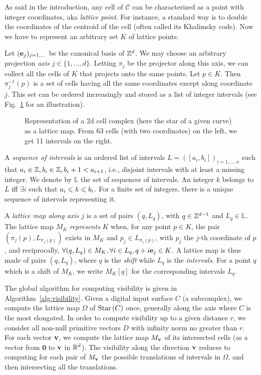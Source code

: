 As said in the introduction, any cell of $\mathcal{C}$ can be
characterized as a point with integer coordinates, aka \emph{lattice
point}. For instance, a standard way is to double the coordinates of
the centroid of the cell (often called its Khalimsky code). Now we
have to represent an arbitrary set $K$ of lattice points.

Let $(\mathbf{e}_j)_{j=1,\dots}$ be the canonical basis of $\mathbb{Z}^d$.  We may
choose an arbitrary projection \emph{axis} $j \in
\{1,\ldots,d\}$. Letting $\pi_j$ be the projector along this axis, we
can collect all the cells of $K$ that projects onto the same
points. Let $p \in K$. Then $\pi^{-1}_j(p)$ is a set of cells having
all the same coordinates except along coordinate $j$. This set can be
ordered increasingly and stored as a list of integer intervals (see
Fig.~\ref{fig:lattice-representation} for an illustration).

\begin{figure}[t]
  \centering
  
  \caption{\label{fig:lattice-representation} Representation of a
    2d cell complex (here the star of a given curve) as a lattice
    map. From 63 cells (with two coordinates) on the left, we get 11
    intervals on the right.}
\end{figure}


A \emph{sequence of intervals} is an ordered list of intervals $L =
([a_i,b_i])_{i=1,\ldots,n}$ such that $a_i \in \mathbb{Z}, b_i \in \mathbb{Z}, b_i + 1
< a_{i+1}$, i.e., disjoint intervals with at least a missing
integer. We denote by $\mathbb{L}$ the set of sequences of
intervals. An integer $k$ belongs to $L$ iff $\exists i$ such that
$a_i \leqslant k \leqslant b_i$. For a finite set of integers, there is a unique
sequence of intervals representing it.

A \emph{lattice map along axis $j$} is a set of pairs $(q,L_q)$, with
$q \in \mathbb{Z}^{d-1}$ and $L_q \in \mathbb{L}$. The lattice map $M_K$
\emph{represents} $K$ when, for any point $p \in K$, the pair
$(\pi_j(p), L_{\pi_j(p)})$ exists in $M_K$ and $p_j \in L_{\pi_j(p)}$,
with $p_j$ the $j$-th coordinate of $p$, and reciprocally, $\forall
(q,L_q) \in M_K, \forall i \in L_q, q+i\mathbf{e}_j \in K$. A lattice map is
thus made of pairs $(q,L_q)$, where $q$ is the \emph{shift} while
$L_q$ is the \emph{intervals}. For a point $q$ which is a shift of
$M_K$, we write $M_K[q]$ for the corresponding intervals $L_q$.

The global algorithm for computing visibility is given in
Algorithm~\ref{alg:visibility}.  Given a digital input surface $C$ (a
subcomplex), we compute the lattice map $\Omega$ of $\mathrm{Star}\left(C\right)$ once,
generally along the axis where $C$ is the most elongated. In order to
compute visibility up to a given distance $r$, we consider all non-null
primitive vectors $D$ with infinity norm no greater than $r$.
For each vector $\mathbf{v}$, we compute the lattice map $M_{\mathbf{v}}$ of its
intersected cells (as a vector from $\mathbf{0}$ to $\mathbf{v}$ in
$\mathbb{R}^d$). The visibility along the direction $\mathbf{v}$ reduces to computing
for each pair of $M_{\mathbf{v}}$ the possible translations of intervals in
$\Omega$, and then intersecting all the translations.

